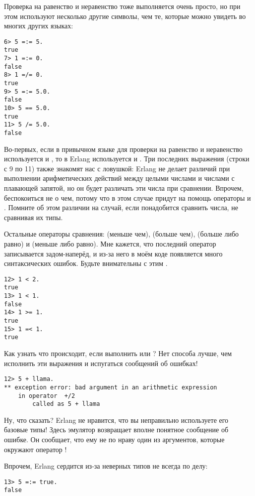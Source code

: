 Проверка на равенство и неравенство тоже выполняется очень просто, но при этом используют несколько другие символы, чем те, которые можно увидеть во многих других языках:
\begin{lstlisting}[style=repl]
6> 5 =:= 5.
true
7> 1 =:= 0.
false
8> 1 =/= 0.
true
9> 5 =:= 5.0.
false
10> 5 == 5.0.
true
11> 5 /= 5.0.
false
\end{lstlisting}

Во\--первых, если в привычном языке для проверки на равенство и неравенство используется \ops{==} и \ops{!=}, то в Erlang используется \ops{=:=} и \ops{=/=}. Три последних выражения (строки с 9 по 11) также знакомят нас с ловушкой: Erlang не делает различий при выполнении арифметических действий между целыми числами и числами с плавающей запятой, но он будет различать эти числа при сравнении. Впрочем, беспокоиться не о чем, потому что в этом случае придут на помощь операторы \ops{==} и \ops{/=}. Помните об этом различии на случай, если понадобится сравнить числа, не сравнивая их типы.

Остальные операторы сравнения: \ops{$<$} (меньше чем), \ops{$>$} (больше чем), \ops{$>=$} (больше либо равно) и \ops{$=<$} (меньше либо равно). Мне кажется, что последний оператор записывается задом\--наперёд, и из\--за него в моём коде появляется много синтаксических ошибок. Будьте внимательны с этим \ops{$=<$}.
\begin{lstlisting}[style=repl]
12> 1 < 2.
true
13> 1 < 1.
false
14> 1 >= 1.
true
15> 1 =< 1.
true
\end{lstlisting}

Как узнать что происходит, если выполнить  или ? Нет способа лучше, чем исполнить эти выражения и испугаться сообщений об ошибках!
\begin{lstlisting}[style=repl]
12> 5 + llama.
** exception error: bad argument in an arithmetic expression
    in operator  +/2
        called as 5 + llama
\end{lstlisting}

Ну, что сказать? Erlang не нравится, что вы неправильно используете его базовые типы! Здесь эмулятор возвращает вполне понятное сообщение об ошибке. Он сообщает, что ему не по нраву один из аргументов, которые окружают оператор \ops{+}!

Впрочем, Erlang сердится из\--за неверных типов не всегда по делу:
\begin{lstlisting}[style=repl]
13> 5 =:= true.
false
\end{lstlisting}

